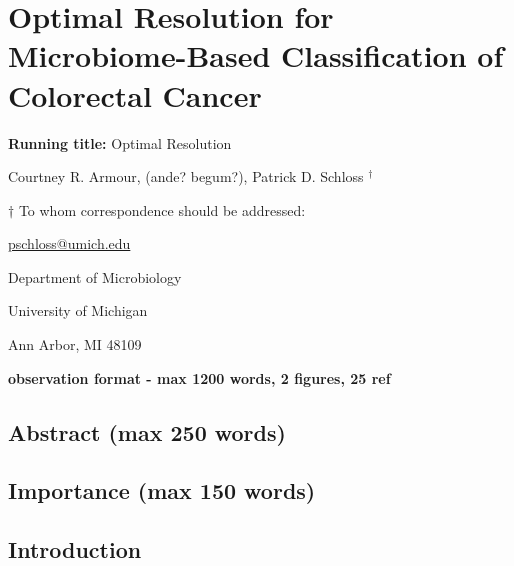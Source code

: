 \documentclass[]{article}
\author{}
\date{\vspace{-2.5em}}
\begin{document}
\section{Optimal Resolution for Microbiome-Based Classification of
Colorectal
Cancer}\label{optimal-resolution-for-microbiome-based-classification-of-colorectal-cancer}

\vspace{20mm}

\textbf{Running title:} Optimal Resolution

\vspace{10mm}

Courtney R. Armour, (ande? begum?), Patrick D. Schloss ${^\dagger}$

\vspace{20mm}

${\dagger}$ To whom correspondence should be addressed:

\href{mailto:pschloss@umich.edu}{pschloss@umich.edu}

Department of Microbiology

University of Michigan

Ann Arbor, MI 48109

\vspace{20mm}

\textbf{observation format - max 1200 words, 2 figures, 25 ref}

\newpage

\subsection{Abstract (max 250 words)}\label{abstract-max-250-words}

\subsection{Importance (max 150 words)}\label{importance-max-150-words}

\newpage

\subsection{Introduction}\label{introduction}
\end{document}
